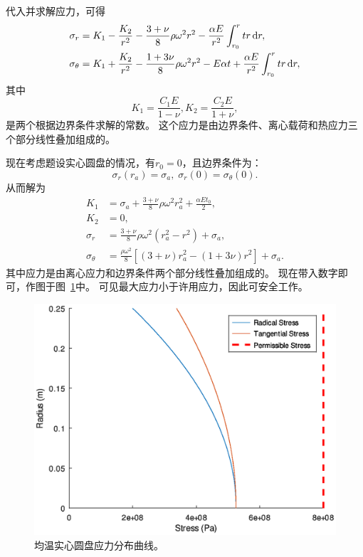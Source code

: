 代入并求解应力，可得
\begin{equation}
    \begin{aligned}
        \sigma_r &= K_1 - \frac{K_2}{r^2} -\frac{3+\nu}{8} \rho \omega^2 r^2 - \frac{\alpha E}{r^2} \int_{r_0}^r tr \mathop{} \! \mathrm{d} r, \\
        \sigma_\theta & = K_1 + \frac{K_2}{r^2} -\frac{1+3\nu}{8} \rho \omega^2 r^2  - E \alpha t + \frac{\alpha E}{r^2} \int_{r_0}^r tr \mathop{} \! \mathrm{d} r,
    \end{aligned}
    \label{equ:uniform-disk-stress}
\end{equation}
其中
\begin{equation}
    K_1 = \frac{C_1 E}{1-\nu}, K_2 = \frac{C_2 E}{1 + \nu},
\end{equation}
是两个根据边界条件求解的常数。
这个应力是由边界条件、离心载荷和热应力三个部分线性叠加组成的。

现在考虑题设实心圆盘的情况，有$r_0 = 0$，且边界条件为：
\begin{equation}
    \sigma_r (r_a) = \sigma_a,\; \sigma_r(0) = \sigma_\theta(0).
\end{equation}
从而解为
\begin{equation}
    \begin{aligned}
        K_1 & = \sigma_a + \frac{3+\nu}{8} \rho \omega^2 r_a^2 + \frac{\alpha E t_0}{2}, \\
        K_2 & = 0, \\
        \sigma_r & = \frac{3 + \nu}{8} \rho \omega^2 (r_a^2 - r^2) + \sigma_a, \\
        \sigma_\theta &= \frac{\rho \omega^2}{8} [(3+\nu) r_a^2 - (1+3\nu)r^2] + \sigma_a.
    \end{aligned}
\end{equation}
其中应力是由离心应力和边界条件两个部分线性叠加组成的。
现在带入数字即可，作图于图~\ref{fig:part-2-question-1}中。
可见最大应力小于许用应力，因此可安全工作。

\begin{figure}[!t]
    \centering
    \includegraphics[width=0.8\linewidth]{part-2-question-1.eps}
    \caption{均温实心圆盘应力分布曲线。}
    \label{fig:part-2-question-1}
\end{figure}

